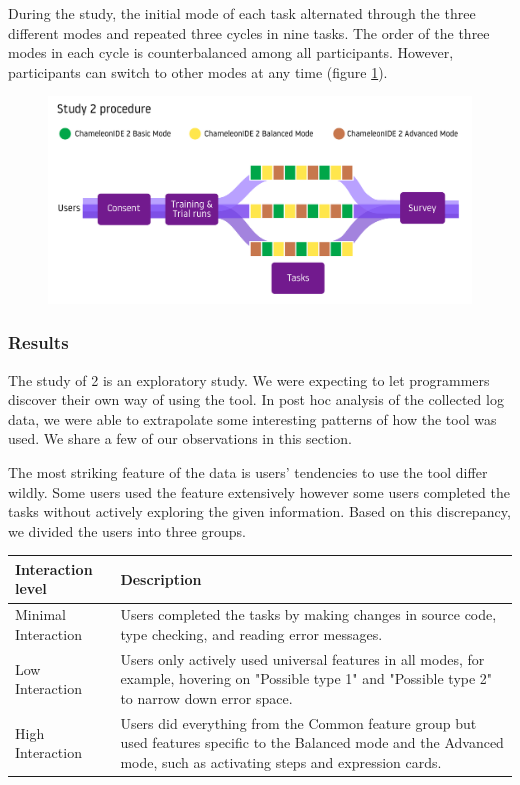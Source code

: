 During the study, the initial mode of each task alternated through the three different modes and repeated three cycles in nine tasks. The order of the three modes in each cycle is counterbalanced among all participants. However, participants can switch to other modes at any time (figure \ref{fig:procedure-2}). 



\begin{figure}[h]
    \centering
    \includegraphics[width=\linewidth]{images/procedure-2.pdf}
    \caption{}
    \label{fig:procedure-2}
\end{figure}

\subsubsection*{\textbf{Results}} 

The study of \chameleon{} 2 is an exploratory study. We were expecting to let programmers discover their own way of using the tool. In post hoc analysis of the collected log data, we were able to extrapolate some interesting patterns of how the tool was used. We share a few of our observations in this section.


The most striking feature of the data is users' tendencies to use the tool differ wildly. Some users used the feature extensively however some users completed the tasks without actively exploring the given information. Based on this discrepancy, we divided the users into three groups.

\begin{tabularx}{\linewidth}{ 
  | >{\raggedright\arraybackslash}X 
  | >{\raggedright\arraybackslash}X  | }

    \hline
        Interaction level & Description \\ \hline
        Minimal Interaction & Users completed the tasks by making changes in source code, type checking, and reading error messages. \\ \hline
        Low Interaction & Users only actively used universal features in all modes, for example, hovering on "Possible type 1" and "Possible type 2" to narrow down error space. \\ \hline
        High Interaction & Users did everything from the Common feature group but used features specific to the Balanced mode and the Advanced mode, such as activating steps and expression cards. \\ \hline
\end{tabularx}



